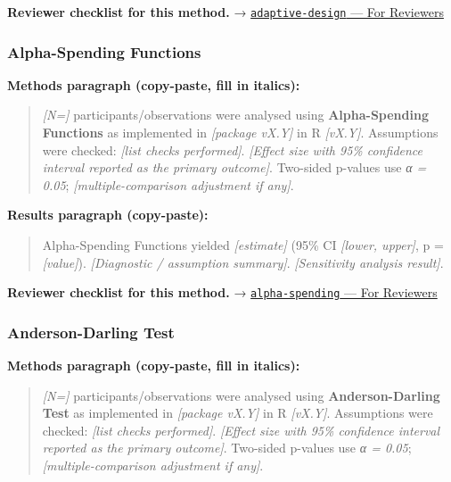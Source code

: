 \documentclass[
]{article}
\begin{document}
\textbf{Reviewer checklist for this method.} →
\href{../chapters/14-clinical/adaptive-design.Rmd\#for-reviewers}{\texttt{adaptive-design}
--- For Reviewers}

\subsubsection{Alpha-Spending Functions}\label{alpha-spending-functions}

\textbf{Methods paragraph (copy-paste, fill in italics):}

\begin{quote}
\emph{{[}N={]}} participants/observations were analysed using
\textbf{Alpha-Spending Functions} as implemented in \emph{{[}package
vX.Y{]}} in R \emph{{[}vX.Y{]}}. Assumptions were checked: \emph{{[}list
checks performed{]}}. \emph{{[}Effect size with 95\% confidence interval
reported as the primary outcome{]}}. Two-sided p-values use \emph{α =
0.05}; \emph{{[}multiple-comparison adjustment if any{]}}.
\end{quote}

\textbf{Results paragraph (copy-paste):}

\begin{quote}
Alpha-Spending Functions yielded \emph{{[}estimate{]}} (95\% CI
\emph{{[}lower, upper{]}}, p = \emph{{[}value{]}}). \emph{{[}Diagnostic
/ assumption summary{]}}. \emph{{[}Sensitivity analysis result{]}}.
\end{quote}

\textbf{Reviewer checklist for this method.} →
\href{../chapters/14-clinical/alpha-spending.Rmd\#for-reviewers}{\texttt{alpha-spending}
--- For Reviewers}

\subsubsection{Anderson-Darling Test}\label{anderson-darling-test}

\textbf{Methods paragraph (copy-paste, fill in italics):}

\begin{quote}
\emph{{[}N={]}} participants/observations were analysed using
\textbf{Anderson-Darling Test} as implemented in \emph{{[}package
vX.Y{]}} in R \emph{{[}vX.Y{]}}. Assumptions were checked: \emph{{[}list
checks performed{]}}. \emph{{[}Effect size with 95\% confidence interval
reported as the primary outcome{]}}. Two-sided p-values use \emph{α =
0.05}; \emph{{[}multiple-comparison adjustment if any{]}}.
\end{quote}
\end{document}
